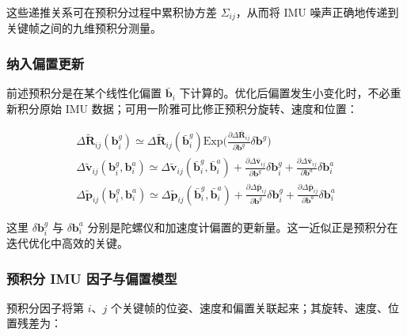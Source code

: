 这些递推关系可在预积分过程中累积协方差 $\Sigma_{ij}$，从而将 IMU 噪声正确地传递到关键帧之间的九维预积分测量。

\subsubsection{纳入偏置更新}

前述预积分是在某个线性化偏置 $\bar{\mathbf b}_i$ 下计算的。优化后偏置发生小变化时，不必重新积分原始 IMU 数据；可用一阶雅可比修正预积分旋转、速度和位置：

\begin{equation}
\begin{array}{r} \Delta \tilde {\pmb {R}} _ {i j} (\mathbf {b} _ {i} ^ {g}) \simeq \Delta \tilde {\pmb {R}} _ {i j} (\bar {\mathbf {b}} _ {i} ^ {g}) \mathrm{Exp} \Big (\frac {\partial \Delta \bar {\pmb {R}} _ {i j}}{\partial \mathbf {b} ^ {g}} \delta \mathbf {b} ^ {g} \Big) \\ \Delta \tilde {\pmb {v}} _ {i j} (\mathbf {b} _ {i} ^ {g}, \mathbf {b} _ {i} ^ {a}) \simeq \Delta \tilde {\pmb {v}} _ {i j} (\bar {\mathbf {b}} _ {i} ^ {g}, \bar {\mathbf {b}} _ {i} ^ {a}) + \frac {\partial \Delta \bar {\pmb {v}} _ {i j}}{\partial \mathbf {b} ^ {g}} \delta \mathbf {b} _ {i} ^ {g} + \frac {\partial \Delta \bar {\pmb {v}} _ {i j}}{\partial \mathbf {b} ^ {a}} \delta \mathbf {b} _ {i} ^ {a} \\ \Delta \tilde {\pmb {p}} _ {i j} (\mathbf {b} _ {i} ^ {g}, \mathbf {b} _ {i} ^ {a}) \simeq \Delta \tilde {\pmb {p}} _ {i j} (\bar {\mathbf {b}} _ {i} ^ {g}, \bar {\mathbf {b}} _ {i} ^ {a}) + \frac {\partial \Delta \bar {\pmb {p}} _ {i j}}{\partial \mathbf {b} ^ {g}} \delta \mathbf {b} _ {i} ^ {g} + \frac {\partial \Delta \bar {\pmb {p}} _ {i j}}{\partial \mathbf {b} ^ {a}} \delta \mathbf {b} _ {i} ^ {a} \end{array}\tag{11.30}
\end{equation}

这里 $\delta\mathbf b_i^g$ 与 $\delta\mathbf b_i^a$ 分别是陀螺仪和加速度计偏置的更新量。这一近似正是预积分在迭代优化中高效的关键。

\subsubsection{预积分 IMU 因子与偏置模型}

预积分因子将第 $i$、$j$ 个关键帧的位姿、速度和偏置关联起来；其旋转、速度、位置残差为：

